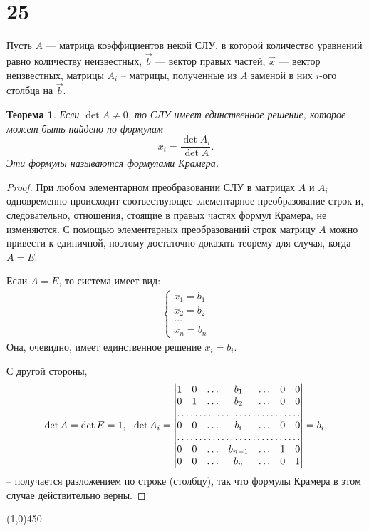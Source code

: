\documentclass[a4paper,12pt]{article}
\newtheorem*{theorem}{Теорема}
\begin{document}
	\section*{25}
	Пусть $A$ — матрица коэффициентов некой СЛУ, в которой количество уравнений равно количеству неизвестных, $\vec b$ — вектор правых частей, $\vec x$ — вектор неизвестных, матрицы $A_i$ -- матрицы, полученные из $A$ заменой в них $i$-ого столбца на $\vec b$.
	\begin{theorem}
		Если $\det A \not= 0$, то СЛУ имеет единственное решение, которое может быть найдено по формулам 
		$$
		x_i = \frac{\det A_i}{\det A}.
		$$ 
		Эти формулы называются формулами Крамера.
	\end{theorem}
	\begin{proof}
		При любом элементарном преобразовании СЛУ в матрицах $A$ и $A_i$ одновременно происходит соотвествующее элементарное преобразование строк и, следовательно, отношения, стоящие в правых частях формул Крамера, не изменяются. С помощью элементарных преобразований строк матрицу $A$ можно привести к единичной, поэтому достаточно доказать теорему для случая, когда $A = E$.
		
		Если $A = E$, то система имеет вид:
		\begin{gather*}
		\begin{cases*}
		x_1 = b_1 \\
		x_2 = b_2 \\
		\dots \\
		x_n = b_n
		\end{cases*}
		\end{gather*}
		Она, очевидно, имеет единственное решение $x_i = b_i$.
		
		С другой стороны,
		\begin{gather*}
		\det A = \det E = 1,\ \ \det A_i = 
		\begin{vmatrix*}
		1 & 0 & \dots & b_1 & \dots & 0 & 0\\
		0 & 1 & \dots & b_2 & \dots & 0 & 0\\
		\hdotsfor{7} \\
		0 & 0 & \dots & b_i & \dots & 0 & 0 \\
		\hdotsfor{7} \\
		0 & 0 & \dots & b_{n-1} & \dots & 1 & 0 \\
		0 & 0 & \dots & b_n & \dots & 0 & 1
		\end{vmatrix*} = b_i,
		\end{gather*} -- получается разложением по строке (столбцу),
		так что формулы Крамера в этом случае действительно верны.
	\end{proof}
	\begin{center}
		\line(1,0){450}
	\end{center}
\end{document}
